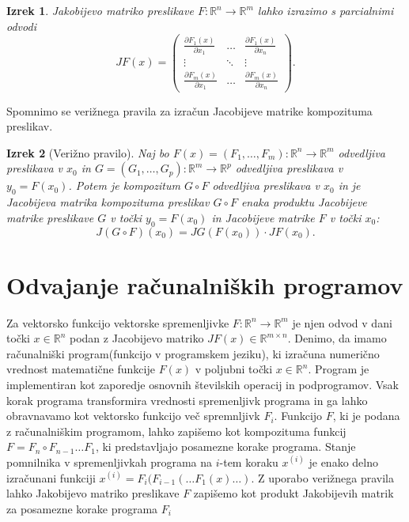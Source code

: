 \documentclass[12pt,slovene]{article}
\newcommand{\RR}{\mathbb R}
\newtheorem{theorem}{Izrek}
\begin{document}
\begin{theorem}
Jakobijevo matriko preslikave $F: \mathbb{R}^n\to \mathbb{R}^m$ lahko izrazimo s parcialnimi odvodi
     $$
     JF(x)=\begin{pmatrix}\frac{\partial F_1(x)}{\partial x_1} & \ldots & 
        \frac{\partial F_1(x)}{\partial x_n}\\
        \vdots & \ddots & \vdots\\
        \frac{\partial F_m(x)}{\partial x_1} & \ldots & 
        \frac{\partial F_m(x)}{\partial x_n}
    \end{pmatrix}.
    $$
\end{theorem}

Spomnimo se verižnega pravila za izračun Jacobijeve matrike kompozituma preslikav.

\begin{theorem}[Verižno pravilo]
Naj bo $F(x)=(F_1,\ldots,F_m):\RR^n\to\RR^m$ odvedljiva preslikava v $x_0$ in $G=(G_1,\ldots,G_p):\RR^m\to \RR^p$ odvedljiva preslikava v $y_0 = F(x_0)$. Potem je kompozitum $G\circ F$ odvedljiva preslikava v $x_0$ in je Jacobijeva matrika kompozituma preslikav $G\circ F$ enaka produktu
Jacobijeve matrike preslikave $G$ v točki $y_0=F(x_0)$ in Jacobijeve matrike $F$ v točki $x_0$:
    $$J(G\circ F)(x_0)=
        JG(F(x_0))\cdot JF(x_0).$$
\end{theorem}

\section{Odvajanje računalniških programov}

 Za vektorsko funkcijo vektorske spremenljivke $F:\RR^n\to \RR^m$ je njen odvod v dani točki $x\in \RR^n$ podan z Jacobijevo matriko $JF(x)\in \RR^{m\times n}$. Denimo, da imamo računalniški program(funkcijo v programskem jeziku), ki izračuna numerično vrednost matematične funkcije $F(x)$ v poljubni točki $x\in\mathbb{R}^n$. Program je implementiran kot zaporedje osnovnih številskih operacij in podprogramov. Vsak korak programa transformira vrednosti spremenljivk programa in ga lahko obravnavamo kot vektorsko funkcijo več spremnljivk $F_i$. Funkcijo $F$, ki je podana z računalniškim programom, lahko zapišemo kot kompozituma funkcij $F = F_n\circ F_{n-1} \ldots F_1$, ki predstavljajo posamezne korake programa. Stanje pomnilnika v spremenljivkah programa na $i$-tem koraku $x^{(i)}$ je enako delno izračunani funkciji $x^{(i)} = F_i(F_{i-1}(\ldots F_1(x)\ldots)$.
 Z uporabo verižnega pravila lahko Jakobijevo matriko preslikave $F$ zapišemo kot produkt Jakobijevih matrik za posamezne korake programa $F_i$
 
\end{document}
